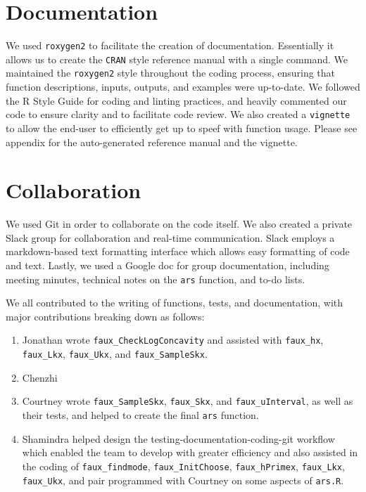 \documentclass{article}\usepackage[]{graphicx}\usepackage[]{color}
\begin{document}
\section{Documentation}

We used \texttt{roxygen2} to facilitate the creation of documentation. 
Essentially it allows us to create the \texttt{CRAN} style reference manual with 
a single command. We maintained the \texttt{roxygen2} style throughout the coding process, 
ensuring that function descriptions, inputs, outputs, and examples were up-to-date.
We followed the R Style Guide for coding and linting practices,
and heavily commented our code to ensure clarity and to facilitate code
review. We also created a \texttt{vignette} to allow the end-user to efficiently
get up to speef with function usage. Please see appendix for the auto-generated 
reference manual and the vignette.

\section{Collaboration}

We used Git in order to collaborate on the code itself. We also created a
private Slack group for collaboration and real-time communication.
Slack employs a markdown-based text formatting interface which allows
easy formatting of code and text.
Lastly, we used a Google doc for group documentation, including
meeting minutes, technical notes on the \texttt{ars} function,
and to-do lists.

We all contributed to the writing of functions, tests, and documentation,
with major contributions breaking down as follows:
\begin{enumerate}
	\item Jonathan wrote \texttt{faux\_CheckLogConcavity} and assisted with
	\texttt{faux\_hx}, \texttt{faux\_Lkx}, \texttt{faux\_Ukx}, and
	\texttt{faux\_SampleSkx}.
	\item Chenzhi 
	\item Courtney wrote \texttt{faux\_SampleSkx}, \texttt{faux\_Skx}, and
	\texttt{faux\_uInterval}, as well as their tests, and helped to create the
	final \texttt{ars} function.
	\item Shamindra helped design the testing-documentation-coding-git workflow
    which enabled the team to develop with greater efficiency and also assisted 
    in the coding of \texttt{faux\_findmode}, \texttt{faux\_InitChoose}, \texttt{faux\_hPrimex}, 
    \texttt{faux\_Lkx}, \texttt{faux\_Ukx}, and pair programmed with Courtney on some aspects of \texttt{ars.R}.
\end{enumerate}
\end{document}
